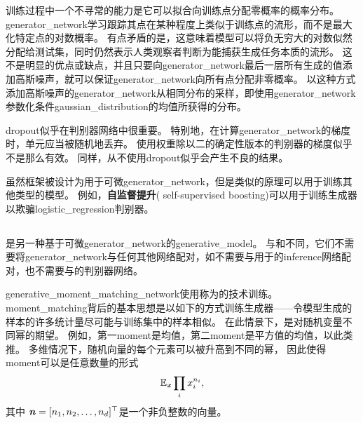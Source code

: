 训练过程中一个不寻常的能力是它可以拟合向训练点分配零概率的概率分布。
\gls{generator_network}学习跟踪其点在某种程度上类似于训练点的流形，而不是最大化特定点的对数概率。
有点矛盾的是，这意味着模型可以将负无穷大的对数似然分配给测试集，同时仍然表示人类观察者判断为能捕获生成任务本质的流形。
这不是明显的优点或缺点，并且只要向\gls{generator_network}最后一层所有生成的值添加高斯噪声，就可以保证\gls{generator_network}向所有点分配非零概率。
以这种方式添加高斯噪声的\gls{generator_network}从相同分布的采样，即使用\gls{generator_network}参数化条件\gls{gaussian_distribution}的均值所获得的分布。


\gls{dropout}似乎在判别器网络中很重要。
特别地，在计算\gls{generator_network}的梯度时，单元应当被随机地丢弃。
使用权重除以二的确定性版本的判别器的梯度似乎不是那么有效。
同样，从不使用\gls{dropout}似乎会产生不良的结果。


虽然框架被设计为用于可微\gls{generator_network}，但是类似的原理可以用于训练其他类型的模型。
例如，\textbf{自监督提升}( self-supervised boosting)可以用于训练生成器以欺骗\gls{logistic_regression}判别器\citep{welling2002self}。


\subsection{}
\label{sec:generative_moment_matching_networks}

\citep{Li-et-al-2015,dziugaite2015training}是另一种基于可微\gls{generator_network}的\gls{generative_model}。
与和不同，它们不需要将\gls{generator_network}与任何其他网络配对，如不需要与用于的\gls{inference}网络配对，也不需要与的判别器网络。


\gls{generative_moment_matching_network}使用称为的技术训练。
\gls{moment_matching}背后的基本思想是以如下的方式训练生成器——令模型生成的样本的许多统计量尽可能与训练集中的样本相似。
在此情景下，是对随机变量不同幂的期望。
例如，第一\gls{moment}是均值，第二\gls{moment}是平方值的均值，以此类推。
多维情况下，随机向量的每个元素可以被升高到不同的幂， 因此使得\gls{moment}可以是任意数量的形式 %
\begin{align}
 \mathbb{E}_{\boldsymbol{\mathit{x}}} \prod_i x_i^{n_i},
\end{align}
其中 $\boldsymbol{\mathit{n}} = [n_1, n_2, \dots, n_d]^\top$是一个非负整数的向量。


